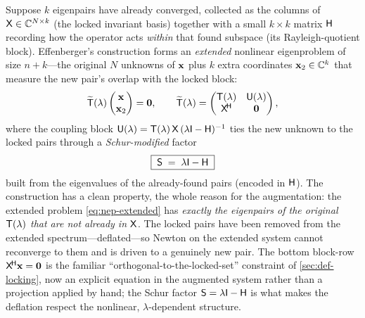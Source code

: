 Suppose $k$ eigenpairs have already converged, collected as the columns of
$\mathsf{X}\in\mathbb{C}^{N\times k}$ (the locked invariant basis) together with a
small $k\times k$ matrix $\mathsf{H}$ recording how the operator acts \emph{within}
that found subspace (its Rayleigh-quotient block). Effenberger's construction
forms an \emph{extended} nonlinear eigenproblem of size $n+k$---the original $N$
unknowns of $\mathbf{x}$ plus $k$ extra coordinates $\mathbf{x}_2\in\mathbb{C}^k$ that measure the
new pair's overlap with the locked block:
\begin{equation}
  \widetilde{\mathsf{T}}(\lambda)
  \begin{pmatrix}\mathbf{x}\\\mathbf{x}_2\end{pmatrix}
  =\mathbf 0,
  \qquad
  \widetilde{\mathsf{T}}(\lambda) =
  \begin{pmatrix}
    \mathsf{T}(\lambda) & \mathsf{U}(\lambda) \\
    \mathsf{X}^{\!\mathsf H} & \mathbf 0
  \end{pmatrix},
  \label{eq:nep-extended}
\end{equation}
where the coupling block $\mathsf{U}(\lambda)=\mathsf{T}(\lambda)\,\mathsf{X}\,
(\lambda\mathsf{I}-\mathsf{H})^{-1}$ ties the new unknown to the locked pairs through a
\emph{Schur-modified} factor
\begin{equation}
  \boxed{\;\mathsf{S} \;=\; \lambda\mathsf{I} - \mathsf{H}\;}
  \label{eq:nep-schur}
\end{equation}
built from the eigenvalues of the already-found pairs (encoded in $\mathsf{H}$). The
construction has a clean property, the whole reason for the augmentation: the
extended problem \cref{eq:nep-extended} has \emph{exactly the eigenpairs of the
original $\mathsf{T}(\lambda)$ that are not already in $\mathsf{X}$}. The locked pairs
have been removed from the extended spectrum---deflated---so Newton on the extended
system cannot reconverge to them and is driven to a genuinely new pair. The bottom
block-row $\mathsf{X}^{\!\mathsf H}\mathbf{x}=\mathbf 0$ is the familiar
``orthogonal-to-the-locked-set'' constraint of \cref{sec:def-locking}, now an
explicit equation in the augmented system rather than a projection applied by
hand; the Schur factor $\mathsf{S}=\lambda\mathsf{I}-\mathsf{H}$ is what makes the
deflation respect the nonlinear, $\lambda$-dependent structure.

